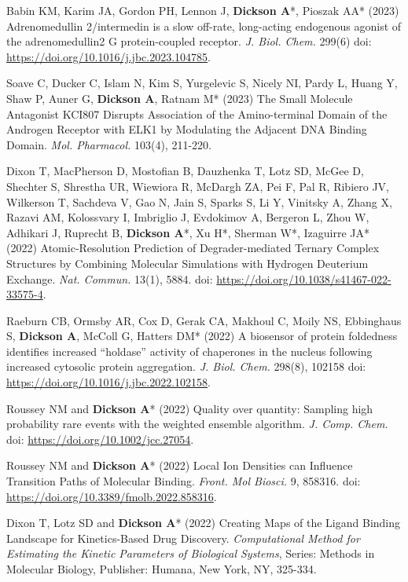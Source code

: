 \documentclass[margin,line]{res}
\begin{document}
\begin{resume}
\begin{spacing}{1.2}
\begin{thebibliography}{10}
  Babin KM, Karim JA, Gordon PH, Lennon J, {\bf Dickson A}*, Pioszak AA* (2023) Adrenomedullin 2/intermedin is a slow off-rate, long-acting endogenous agonist of the adrenomedullin2 G protein-coupled receptor.
  \newblock \textit{J. Biol. Chem.} 299(6) doi: \url{https://doi.org/10.1016/j.jbc.2023.104785}.

  Soave C, Ducker C, Islam N, Kim S, Yurgelevic S, Nicely NI, Pardy L, Huang Y, Shaw P, Auner G, {\bf Dickson A}, Ratnam M* (2023) The Small Molecule Antagonist KCI807 Disrupts Association of the Amino-terminal Domain of the Androgen Receptor with ELK1 by Modulating the Adjacent DNA Binding Domain.
  \newblock \textit{Mol. Pharmacol.} 103(4), 211-220. 

  Dixon T, MacPherson D, Mostofian B, Dauzhenka T, Lotz SD, McGee D, Shechter S, Shrestha UR, Wiewiora R, McDargh ZA, Pei F, Pal R, Ribiero JV, Wilkerson T, Sachdeva V, Gao N, Jain S, Sparks S, Li Y, Vinitsky A, Zhang X, Razavi AM, Kolossvary I, Imbriglio J, Evdokimov A, Bergeron L, Zhou W, Adhikari J, Ruprecht B, {\bf Dickson A}*, Xu H*, Sherman W*, Izaguirre JA* (2022) Atomic-Resolution Prediction of Degrader-mediated Ternary Complex Structures by Combining Molecular Simulations with Hydrogen Deuterium Exchange.
  \newblock \textit{Nat. Commun.} 13(1), 5884. doi: \url{https://doi.org/10.1038/s41467-022-33575-4}.

Raeburn CB, Ormsby AR, Cox D, Gerak CA, Makhoul C, Moily NS, Ebbinghaus S, {\bf Dickson A}, McColl G, Hatters DM* (2022) A biosensor of protein foldedness identifies increased “holdase” activity of chaperones in the nucleus following increased cytosolic protein aggregation.
\newblock \textit{J. Biol. Chem.} 298(8), 102158 doi: \url{https://doi.org/10.1016/j.jbc.2022.102158}. 

Roussey NM and {\bf Dickson A}* (2022) Quality over quantity: Sampling high probability rare events with the weighted ensemble algorithm.
\newblock \textit{J. Comp. Chem.} doi: \url{https://doi.org/10.1002/jcc.27054}.

Roussey NM and {\bf Dickson A}* (2022) Local Ion Densities can Influence Transition Paths of Molecular Binding.
\newblock \textit{Front. Mol Biosci.} 9, 858316. doi: \url{https://doi.org/10.3389/fmolb.2022.858316}.

  Dixon T, Lotz SD and {\bf Dickson A}* (2022) Creating Maps of the Ligand Binding Landscape for Kinetics-Based Drug Discovery.
  \newblock \textit{Computational Method for Estimating the Kinetic Parameters of Biological Systems}, Series: Methods in Molecular Biology, Publisher: Humana, New York, NY, 325-334.


\end{thebibliography}
\end{spacing}
\end{resume}
\end{document}

